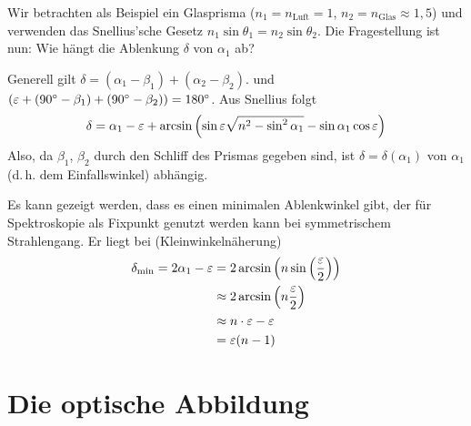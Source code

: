
Wir betrachten als Beispiel ein Glasprisma ($n_1=n_\text{Luft}=1$,
$n_2=n_\text{Glas}\approx 1,5$) und verwenden das Snellius'sche Gesetz
$n_1\sin\theta_1 = n_2\sin\theta_2$.
Die Fragestellung ist nun: Wie hängt die Ablenkung $\delta$ von
$\alpha_1$ ab?

Generell gilt $\delta = (\alpha_1-\beta_1)+(\alpha_2-\beta_2)$.
und $(\varepsilon+(\ang{90}-\beta_1)+(\ang{90}-\beta_2))=\ang{180}$.
Aus Snellius folgt
\begin{gather*}
  \delta = \alpha_1 - \varepsilon
  + \arcsin\left(
    \sin\varepsilon\sqrt{n^2-\sin^2\alpha_1}-\sin\alpha_1\cos\varepsilon
    \right)
\end{gather*}
Also, da $\beta_1$, $\beta_2$ durch den Schliff des Prismas gegeben
sind, ist $\delta=\delta(\alpha_1)$ von $\alpha_1$ (d.\,h. dem
Einfallswinkel) abhängig.

Es kann gezeigt werden, dass es einen minimalen Ablenkwinkel gibt, der
für Spektroskopie als Fixpunkt genutzt werden kann bei symmetrischem
Strahlengang. Er liegt bei (Kleinwinkelnäherung)
\begin{align*}
  \delta_\text{min} 
  = 2\alpha_1-\varepsilon 
  &= 2\arcsin\left(n\sin\left(\frac{\varepsilon}{2}\right)\right)\\
  &\approx 2\arcsin\left(n\frac{\varepsilon}{2}\right)\\
  &\approx n\cdot\varepsilon - \varepsilon \\
  &= \varepsilon(n-1)
\end{align*}



\section{Die optische Abbildung}

